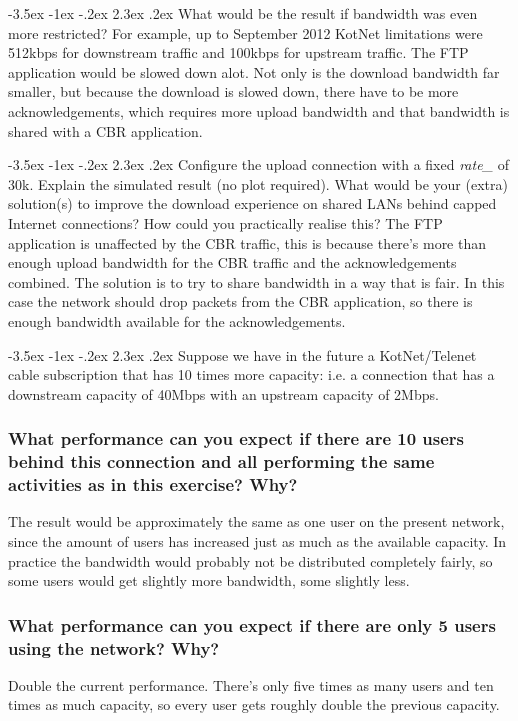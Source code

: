 \documentclass[9pt, a4paper, oneside]{article}
\makeatletter
\renewcommand\subsection{\@startsection{subsection}{2}{\z@}
    {-3.5ex \@plus -1ex \@minus -.2ex}
    {2.3ex \@plus.2ex}
    {\normalfont\normalsize\bfseries}}
\makeatother
\begin{document}
\subsection{What would be the result if bandwidth was even more restricted?
    For example, up to September 2012 KotNet limitations were 512kbps for
    downstream traffic and 100kbps for upstream traffic.}
The FTP application would be slowed down alot.
Not only is the download bandwidth far smaller, but because the download is
slowed down, there have to be more acknowledgements, which requires more
upload bandwidth and that bandwidth is shared with a CBR application.

\subsection{Configure the upload connection with a fixed \emph{rate\_} of 30k.
    Explain the simulated result (no plot required).
    What would be your (extra) solution(s) to improve the download experience
    on shared LANs behind capped Internet connections?
    How could you practically realise this?}
The FTP application is unaffected by the CBR traffic, this is because there's
more than enough upload bandwidth for the CBR traffic and the acknowledgements
combined.
The solution is to try to share bandwidth in a way that is fair.
In this case the network should drop packets from the CBR application, so
there is enough bandwidth available for the acknowledgements.

\subsection{Suppose we have in the future a KotNet/Telenet cable subscription
    that has 10 times more capacity: i.e. a connection that has a downstream
    capacity of 40Mbps with an upstream capacity of 2Mbps.}

\hspace*{\fill}\begin{minipage}{0.94\textwidth}
    \subsubsection{What performance can you expect if there are 10 users behind
        this connection and all performing the same activities as in this
        exercise? Why?}
    The result would be approximately the same as one user on the present
    network, since the amount of users has increased just as much as the
    available capacity.
    In practice the bandwidth would probably not be distributed completely
    fairly, so some users would get slightly more bandwidth, some slightly less.
    
    \subsubsection{What performance can you expect if there are only 5 users
        using the network? Why?}
    Double the current performance.
    There's only five times as many users and ten times as much capacity,
    so every user gets roughly double the previous capacity.
\end{minipage}
\end{document}
